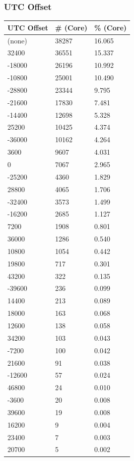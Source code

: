\subsubsection{UTC Offset}
\begin{tabular}{| l | l | l |}
\hline
\textbf{UTC Offset} & \textbf{\# (Core)} & \textbf{\% (Core)} \\ \hline
(none)	&	38287	&	16.065	\\ \hline
32400	&	36551	&	15.337	\\ \hline
-18000	&	26196	&	10.992	\\ \hline
-10800	&	25001	&	10.490	\\ \hline
-28800	&	23344	&	9.795	\\ \hline
-21600	&	17830	&	7.481	\\ \hline
-14400	&	12698	&	5.328	\\ \hline
25200	&	10425	&	4.374	\\ \hline
-36000	&	10162	&	4.264	\\ \hline
3600	&	9607	&	4.031	\\ \hline
0	&	7067	&	2.965	\\ \hline
-25200	&	4360	&	1.829	\\ \hline
28800	&	4065	&	1.706	\\ \hline
-32400	&	3573	&	1.499	\\ \hline
-16200	&	2685	&	1.127	\\ \hline
7200	&	1908	&	0.801	\\ \hline
36000	&	1286	&	0.540	\\ \hline
10800	&	1054	&	0.442	\\ \hline
19800	&	717	&	0.301	\\ \hline
43200	&	322	&	0.135	\\ \hline
-39600	&	236	&	0.099	\\ \hline
14400	&	213	&	0.089	\\ \hline
18000	&	163	&	0.068	\\ \hline
12600	&	138	&	0.058	\\ \hline
34200	&	103	&	0.043	\\ \hline
-7200	&	100	&	0.042	\\ \hline
21600	&	91	&	0.038	\\ \hline
-12600	&	57	&	0.024	\\ \hline
46800	&	24	&	0.010	\\ \hline
-3600	&	20	&	0.008	\\ \hline
39600	&	19	&	0.008	\\ \hline
16200	&	9	&	0.004	\\ \hline
23400	&	7	&	0.003	\\ \hline
20700	&	5	&	0.002	\\ \hline
\end{tabular}
\vspace{2.5in}

